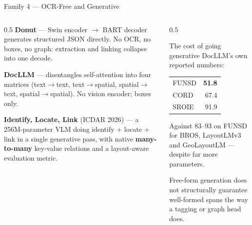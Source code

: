 \documentclass[aspectratio=169, 11pt]{beamer}
\newcommand{\gap}[1]{{\color{warn}\textbf{#1}}}
\begin{document}
\begin{frame}{Family 4 — OCR-Free and Generative}
  \begin{columns}[T]
    \begin{column}{0.5\textwidth}
      \small
      \textbf{Donut} — Swin encoder $\to$ BART decoder generates structured JSON directly.
      No OCR, no boxes, no graph: extraction and linking collapse into one decode.
      \smallskip

      \textbf{DocLLM} — disentangles self-attention into four matrices (text$\to$text,
      text$\to$spatial, spatial$\to$text, spatial$\to$spatial). No vision encoder; boxes only.
      \smallskip

      \textbf{Identify, Locate, Link} (ICDAR 2026) — a 256M-parameter VLM doing identify +
      locate + link in a single generative pass, with native \textbf{many-to-many} key-value
      relations and a layout-aware evaluation metric.
    \end{column}
    \begin{column}{0.5\textwidth}
      \begin{alertblock}{The cost of going generative}
        \small
        DocLLM's own reported numbers:
        \smallskip

        \begin{tabular}{@{}lr@{}}
          FUNSD & \gap{51.8} \\
          CORD & 67.4 \\
          SROIE & 91.9 \\
        \end{tabular}
        \smallskip

        Against 83--93 on FUNSD for BROS, LayoutLMv3 and GeoLayoutLM — despite far more parameters.
      \end{alertblock}
      {\footnotesize\color{muted}
      Free-form generation does not structurally guarantee well-formed spans the way a tagging or graph head does.}
    \end{column}
  \end{columns}
\end{frame}
\end{document}
